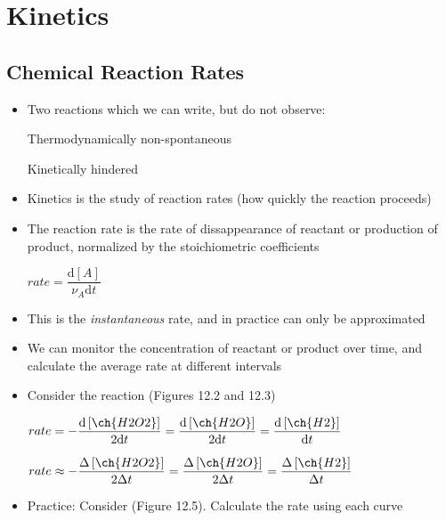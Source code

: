 \documentclass[12pt, openany, letterpaper]{memoir}
\begin{document}
\chapter{Kinetics}

\section{Chemical Reaction Rates}
\begin{itemize}
  \item Two reactions which we can write, but do not observe:

     \hspace{2em} Thermodynamically non-spontaneous

     \hspace{2em} Kinetically hindered
  \item Kinetics is the study of reaction rates (how quickly the reaction proceeds)
  \item The reaction rate is the rate of dissappearance of reactant or production of product, normalized by the stoichiometric coefficients

    $rate=\dfrac{\mathrm{d}\left[A\right]}{\nu_A\mathrm{d}t}$
  \item This is the \emph{instantaneous} rate, and in practice can only be approximated
  \item We can monitor the concentration of reactant or product over time, and calculate the average rate at different intervals
  \item Consider the reaction  (Figures 12.2 and 12.3)

    $rate = -\dfrac{\mathrm{d}\left[\ch{H2O2}\right]}{2\mathrm{d}t} = \dfrac{\mathrm{d}\left[\ch{H2O}\right]}{2\mathrm{d}t} = \dfrac{\mathrm{d}\left[\ch{H2}\right]}{\mathrm{d}t}$

    $rate \approx -\dfrac{\Delta\left[\ch{H2O2}\right]}{2\Delta t} = \dfrac{\Delta\left[\ch{H2O}\right]}{2\Delta t} = \dfrac{\Delta\left[\ch{H2}\right]}{\Delta t}$
  \item Practice: Consider  (Figure 12.5). Calculate the rate using each curve
\end{itemize}
\end{document}
